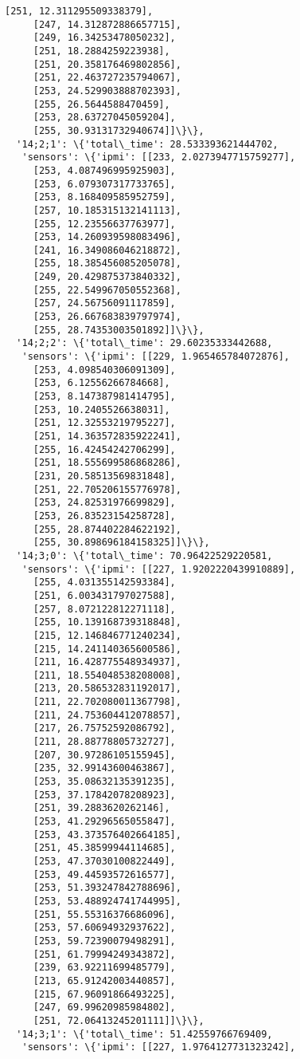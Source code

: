\documentclass[11pt]{article}
\begin{document}
\begin{tcolorbox}[breakable, size=fbox, boxrule=.5pt, pad at break*=1mm, opacityfill=0]
\begin{Verbatim}[commandchars=\\\{\}]
     [251, 12.311295509338379],
     [247, 14.312872886657715],
     [249, 16.34253478050232],
     [251, 18.2884259223938],
     [251, 20.358176469802856],
     [251, 22.463727235794067],
     [253, 24.529903888702393],
     [255, 26.5644588470459],
     [253, 28.63727045059204],
     [255, 30.93131732940674]]\}\},
  '14;2;1': \{'total\_time': 28.533393621444702,
   'sensors': \{'ipmi': [[233, 2.0273947715759277],
     [253, 4.087496995925903],
     [253, 6.079307317733765],
     [253, 8.168409585952759],
     [257, 10.185315132141113],
     [255, 12.23556637763977],
     [253, 14.260939598083496],
     [241, 16.349086046218872],
     [255, 18.385456085205078],
     [249, 20.429875373840332],
     [255, 22.549967050552368],
     [257, 24.56756091117859],
     [253, 26.667683839797974],
     [255, 28.74353003501892]]\}\},
  '14;2;2': \{'total\_time': 29.60235333442688,
   'sensors': \{'ipmi': [[229, 1.965465784072876],
     [253, 4.098540306091309],
     [253, 6.12556266784668],
     [253, 8.147387981414795],
     [253, 10.2405526638031],
     [251, 12.32553219795227],
     [251, 14.363572835922241],
     [255, 16.42454242706299],
     [251, 18.555699586868286],
     [231, 20.58513569831848],
     [251, 22.705206155776978],
     [253, 24.82531976699829],
     [253, 26.83523154258728],
     [255, 28.874402284622192],
     [255, 30.898696184158325]]\}\},
  '14;3;0': \{'total\_time': 70.96422529220581,
   'sensors': \{'ipmi': [[227, 1.9202220439910889],
     [255, 4.031355142593384],
     [251, 6.003431797027588],
     [257, 8.072122812271118],
     [255, 10.139168739318848],
     [215, 12.146846771240234],
     [215, 14.241140365600586],
     [211, 16.428775548934937],
     [211, 18.554048538208008],
     [213, 20.586532831192017],
     [211, 22.702080011367798],
     [211, 24.753604412078857],
     [217, 26.75752592086792],
     [211, 28.88778805732727],
     [207, 30.97286105155945],
     [235, 32.99143600463867],
     [253, 35.08632135391235],
     [253, 37.17842078208923],
     [251, 39.2883620262146],
     [253, 41.29296565055847],
     [253, 43.373576402664185],
     [251, 45.38599944114685],
     [253, 47.37030100822449],
     [253, 49.44593572616577],
     [253, 51.393247842788696],
     [253, 53.488924741744995],
     [251, 55.55316376686096],
     [253, 57.60694932937622],
     [253, 59.72390079498291],
     [251, 61.79994249343872],
     [239, 63.92211699485779],
     [213, 65.91242003440857],
     [215, 67.96091866493225],
     [247, 69.99620985984802],
     [251, 72.06413245201111]]\}\},
  '14;3;1': \{'total\_time': 51.42559766769409,
   'sensors': \{'ipmi': [[227, 1.9764127731323242],

\end{Verbatim}
\end{tcolorbox}
\end{document}
